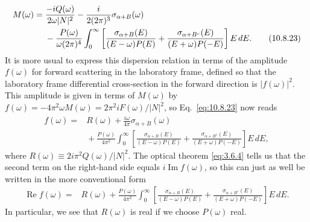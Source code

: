 \begin{align}
  M(\omega)={}&\frac{-iQ(\omega)}{2\omega|N|^2}
  -\frac{i}{2(2\pi)^3}\sigma_{\alpha+B}(\omega)\notag\\
  &{}-\frac{P(\omega)}{\omega(2\pi)^4}\int_0^\infty
  \left[\frac{\sigma_{\alpha+B}(E)}{(E-\omega)P(E)}
  +\frac{\sigma_{\alpha+B^c}(E)}{(E+\omega)P(-E)}\right]E\,dE.
  \tag{10.8.23}\label{eq:10.8.23}
\end{align}
It is more usual to express this dispersion relation in terms of the
amplitude $f(\omega)$ for forward scattering in the laboratory frame,
defined so that the laboratory frame differential cross-section in the forward
direction is $|f(\omega)|^2$. This amplitude is given in terms of $M(\omega)$
by $f(\omega)=-4\pi^2\omega M(\omega)=2\pi^2iF(\omega)/|N|^2$, so
Eq.~\eqref{eq:10.8.23} now reads
\begin{align*}
  f(\omega)={}&R(\omega)+\frac{i\omega}{4\pi}
  \sigma_{\alpha+B}(\omega)\\
  &{}+\frac{P(\omega)}{4\pi^2}\int_0^\infty
  \left[\frac{\sigma_{\alpha+B}(E)}{(E-\omega)P(E)}
  +\frac{\sigma_{\alpha+B^c}(E)}{(E+\omega)P(-E)}\right]E\,dE,
\end{align*}
where $R(\omega)\equiv2i\pi^2Q(\omega)/|N|^2$. The optical theorem
\eqref{eq:3.6.4} tells us that the second term on the right-hand side equals
$i\operatorname{Im}f(\omega)$, so this can just as well be written in the more
conventional form
\begin{align}
  \operatorname{Re}f(\omega)={}&R(\omega)
  +\frac{P(\omega)}{4\pi^2}\int_0^\infty
  \left[\frac{\sigma_{\alpha+B}(E)}{(E-\omega)P(E)}
  +\frac{\sigma_{\alpha+B^c}(E)}{(E+\omega)P(-E)}\right]E\,dE.
  \tag{10.8.24}\label{eq:10.8.24}
\end{align}
In particular, we see that $R(\omega)$ is real if we choose $P(\omega)$ real.

